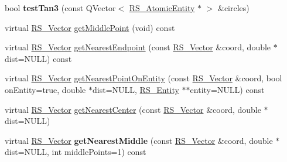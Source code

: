\begin{DoxyCompactItemize}
\item 
\hypertarget{classRS__Circle_a1d0c5e1014a524c76f043aae714a67b8}{bool {\bfseries test\-Tan3} (const Q\-Vector$<$ \hyperlink{classRS__AtomicEntity}{R\-S\-\_\-\-Atomic\-Entity} $\ast$ $>$ \&circles)}\label{classRS__Circle_a1d0c5e1014a524c76f043aae714a67b8}

\item 
virtual \hyperlink{classRS__Vector}{R\-S\-\_\-\-Vector} \hyperlink{classRS__Circle_a77a5a6a01fd611a3acf45099174d682c}{get\-Middle\-Point} (void) const 
\item 
virtual \hyperlink{classRS__Vector}{R\-S\-\_\-\-Vector} \hyperlink{classRS__Circle_a3a60c5ca1541cf2fe882ca84234d696e}{get\-Nearest\-Endpoint} (const \hyperlink{classRS__Vector}{R\-S\-\_\-\-Vector} \&coord, double $\ast$dist=N\-U\-L\-L) const 
\item 
virtual \hyperlink{classRS__Vector}{R\-S\-\_\-\-Vector} \hyperlink{classRS__Circle_a22bdd4ca3686cc422f276ad017d132a4}{get\-Nearest\-Point\-On\-Entity} (const \hyperlink{classRS__Vector}{R\-S\-\_\-\-Vector} \&coord, bool on\-Entity=true, double $\ast$dist=N\-U\-L\-L, \hyperlink{classRS__Entity}{R\-S\-\_\-\-Entity} $\ast$$\ast$entity=N\-U\-L\-L) const 
\item 
virtual \hyperlink{classRS__Vector}{R\-S\-\_\-\-Vector} \hyperlink{classRS__Circle_a362cb5d5a1ffd76226f19e4826bee96c}{get\-Nearest\-Center} (const \hyperlink{classRS__Vector}{R\-S\-\_\-\-Vector} \&coord, double $\ast$dist=N\-U\-L\-L)
\item 
\hypertarget{classRS__Circle_a26966c156e3b46b35b2ee2712c7df97d}{virtual \hyperlink{classRS__Vector}{R\-S\-\_\-\-Vector} {\bfseries get\-Nearest\-Middle} (const \hyperlink{classRS__Vector}{R\-S\-\_\-\-Vector} \&coord, double $\ast$dist=N\-U\-L\-L, int middle\-Points=1) const }\label{classRS__Circle_a26966c156e3b46b35b2ee2712c7df97d}


\end{DoxyCompactItemize}

